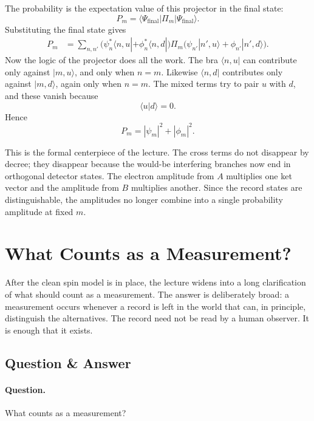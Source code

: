The probability is the expectation value of this projector in the final state:
\begin{equation}
P_m = \langle \Psi_{\mathrm{final}}|\Pi_m|\Psi_{\mathrm{final}}\rangle .
\end{equation}
Substituting the final state gives
\begin{align}
P_m
&=
\sum_{n,n'}
\bigl(\psi_n^*\langle n,u|+\phi_n^*\langle n,d|\bigr)
\Pi_m
\bigl(\psi_{n'}|n',u\rangle+\phi_{n'}|n',d\rangle\bigr) .
\end{align}
Now the logic of the projector does all the work. The bra \(\langle n,u|\) can contribute only against \(|m,u\rangle\), and only when \(n=m\). Likewise \(\langle n,d|\) contributes only against \(|m,d\rangle\), again only when \(n=m\). The mixed terms try to pair \(u\) with \(d\), and these vanish because
\begin{equation}
\langle u|d\rangle = 0 .
\end{equation}
Hence
\begin{equation}
P_m = |\psi_m|^2 + |\phi_m|^2 .
\end{equation}

This is the formal centerpiece of the lecture. The cross terms do not disappear by decree; they disappear because the would-be interfering branches now end in orthogonal detector states. The electron amplitude from \(A\) multiplies one ket vector and the amplitude from \(B\) multiplies another. Since the record states are distinguishable, the amplitudes no longer combine into a single probability amplitude at fixed \(m\).

\section{What Counts as a Measurement?}

After the clean spin model is in place, the lecture widens into a long clarification of what should count as a measurement. The answer is deliberately broad: a measurement occurs whenever a record is left in the world that can, in principle, distinguish the alternatives. The record need not be read by a human observer. It is enough that it exists.

\subsection{Question \& Answer}

\paragraph{Question.} What counts as a measurement?

